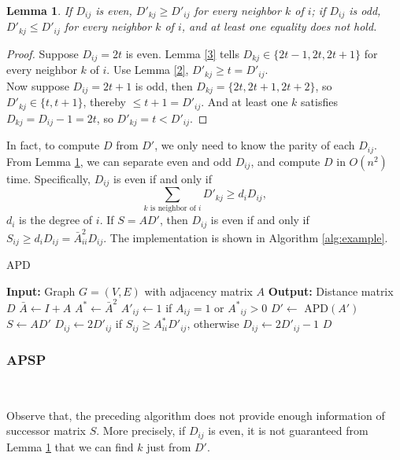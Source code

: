 \documentclass[11pt]{article}
\theoremstyle{plain}
\newtheorem{lemma}{Lemma}[section]
\begin{document}
\begin{lemma}
\label{4}
If $D_{ij}$ is even, $D'_{kj}\ge D'_{ij}$ for every neighbor $k$ of $i$; if $D_{ij}$ is odd, $D'_{kj}\le D'_{ij}$ for every neighbor $k$ of $i$, and at least one equality does not hold.
\end{lemma}
\begin{proof}
Suppose $D_{ij}=2t$ is even. Lemma \ref{3} tells $D_{kj}\in\{2t-1,2t,2t+1\}$ for every neighbor $k$ of $i$. Use Lemma \ref{2}, $D'_{kj}\ge t=D'_{ij}$. \\
Now suppose $D_{ij}=2t+1$ is odd, then $D_{kj}=\{2t,2t+1,2t+2\}$, so $D'_{kj}\in \{t,t+1\}$, thereby $\le t+1=D'_{ij}$. And at least one $k$ satisfies $D_{kj}=D_{ij}-1=2t$, so $D'_{kj}=t<D'_{ij}$.
\end{proof}

In fact, to compute $D$ from $D'$, we only need to know the parity of each $D_{ij}$. From Lemma \ref{4}, we can separate even and odd $D_{ij}$, and compute $D$ in $O(n^2)$ time. Specifically, $D_{ij}$ is even if and only if
$$\sum\limits_{k\text{ is neighbor of }i} D'_{kj}\ge d_iD_{ij},$$
$d_i$ is the degree of $i$. If $S=AD'$, then $D_{ij}$ is even if and only if $S_{ij}\ge d_iD_{ij}=\bar A^2_{ii}D_{ij}$. The implementation is shown in Algorithm \ref{alg:example}.

\begin{algorithm}
\caption{APD}
\label{alg:example}
\begin{algorithmic}[1]
    \STATE \textbf{Input:} Graph $G=(V,E)$ with adjacency matrix $A$
    \STATE \textbf{Output:} Distance matrix $D$
    \STATE $\bar A\leftarrow I+A$
    \STATE $A^*\leftarrow \bar A^2$
            \STATE $A'_{ij}\leftarrow 1$ if $A_{ij}=1$ or ${A^*}_{ij}>0$
        \ENDFOR
    \ENDFOR
    \STATE $D'\leftarrow$ APD$(A')$
    \STATE $S\leftarrow AD'$
            \STATE $D_{ij}\leftarrow 2D'_{ij}$ if $S_{ij}\ge A^*_{ii}D'_{ij}$, otherwise $D_{ij}\leftarrow 2D'_{ij}-1$
        \ENDFOR
    \ENDFOR
    \RETURN $D$
\end{algorithmic}
\end{algorithm}

\subsubsection{APSP}\

Observe that, the preceding algorithm does not provide enough information of successor matrix $S$. More precisely, if $D_{ij}$ is even, it is not guaranteed from Lemma \ref{4} that we can find $k$ just from $D'$.
\end{document}
